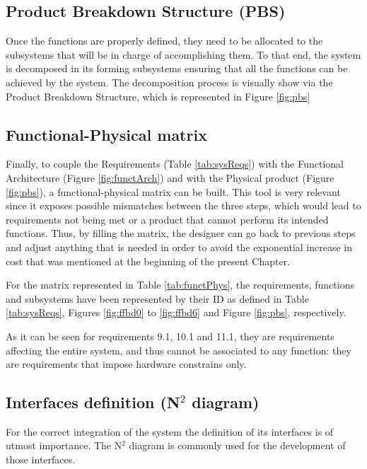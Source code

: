 \subsection{Product Breakdown Structure (PBS)}

Once the functions are properly defined, they need to be allocated to the subsystems that will be in charge of accomplishing them.
To that end, the system is decomposed in its forming subsystems ensuring that all the functions can be achieved by the system.
The decomposition process is visually show via the Product Breakdown Structure, which is represented in Figure \ref{fig:pbs}




\subsection{Functional-Physical matrix}

Finally, to couple the Requirements (Table \ref{tab:sysReqs}) with the Functional Architecture (Figure \ref{fig:functArch}) and with the Physical product (Figure \ref{fig:pbs}), a functional-physical matrix can be built.
This tool is very relevant since it exposes possible mismatches between the three steps, which would lead to requirements not being met or a product that cannot perform its intended functions.
Thus, by filling the matrix, the designer can go back to previous steps and adjust anything that is needed in order to avoid the exponential increase in cost that was mentioned at the beginning of the present Chapter.

For the matrix represented in Table \ref{tab:functPhys}, the requirements, functions and subsystems have been represented by their ID as defined in Table \ref{tab:sysReqs}, Figures \ref{fig:ffbd0} to \ref{fig:ffbd6} and Figure \ref{fig:pbs}, respectively.



As it can be seen for requirements 9.1, 10.1 and 11.1, they are requirements affecting the entire system, and thus cannot be associated to any function: they are requirements that impose hardware constrains only.

\subsection{Interfaces definition (N$^2$ diagram)}

For the correct integration of the system the definition of its interfaces is of utmost importance.
The N$^2$ diagram is commonly used for the development of those interfaces.

